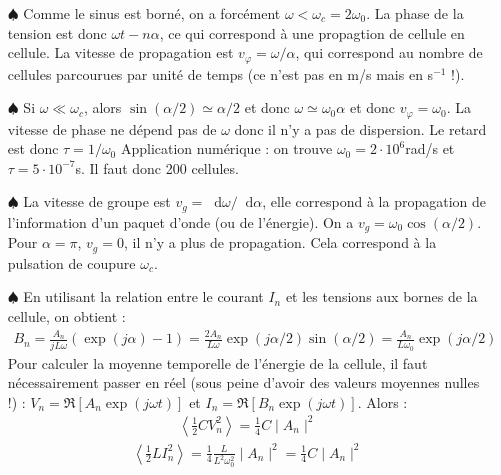 \documentclass{report}
\newcommand*\dif{\mathop{}\!\mathrm{d}}
\begin{document}
\begin{itemize}
	\item[$\spadesuit$] Comme le sinus est borné, on a forcément $\omega<\omega_c=2\omega_0$. La phase de la tension est donc $\omega t -n\alpha$, ce qui correspond à une propagtion de cellule en cellule. La vitesse de propagation est $v_\varphi=\omega/\alpha$, qui correspond au nombre de cellules parcourues par unité de temps (ce n'est pas en m/s mais en s$^{-1}$ !).
	
	\item[$\spadesuit$] Si $\omega\ll\omega_c$, alors $\sin(\alpha/2)\simeq\alpha/2$ et donc $\omega\simeq\omega_0\alpha$ et donc $v_\varphi=\omega_0$. La vitesse de phase ne dépend pas de $\omega$ donc il n'y a pas de dispersion. Le retard est donc $\tau=1/\omega_0$ Application numérique : on trouve $\omega_0=2\cdot10^6$rad/s et $\tau=5\cdot10^{-7}$s. Il faut donc 200 cellules. 

	\item[$\spadesuit$] La vitesse de groupe est $v_g=\dif \omega /\dif \alpha$, elle correspond à la propagation de l'information d'un paquet d'onde (ou de l'énergie). On a $v_g=\omega_0\cos(\alpha/2)$. Pour $\alpha=\pi$, $v_g=0$, il n'y a plus de propagation. Cela correspond à la pulsation de coupure $\omega_c$.
	
	\item[$\spadesuit$] En utilisant la relation entre le courant $I_n$ et les tensions aux bornes de la cellule, on obtient :
\begin{align*}
	B_n=\frac{A_n}{jL\omega}(\exp(j\alpha)-1)=\frac{2A_n}{L\omega}\exp(j\alpha/2)\sin(\alpha/2)=\frac{A_n}{L\omega_0}\exp(j\alpha/2)
\end{align*}	
	 Pour calculer la moyenne temporelle de l'énergie de la cellule, il faut nécessairement passer en réel (sous peine d'avoir des valeurs moyennes nulles !) : $V_n=\Re[A_n\exp(j\omega t)]$ et $I_n=\Re[B_n\exp(j\omega t)]$. Alors :
	   	\begin{align*}
	   		\left\langle\frac{1}{2}CV_n^2 \right\rangle =\frac{1}{4}C\mid A_n\mid^2
	   	\end{align*}
	    \begin{align*}
	   		\left\langle\frac{1}{2}LI_n^2 \right\rangle =\frac{1}{4}\frac{L}{L^2\omega_0^2}\mid A_n\mid^2=\frac{1}{4}C\mid A_n\mid^2
	   	\end{align*}
	   	

\end{itemize}
\end{document}
